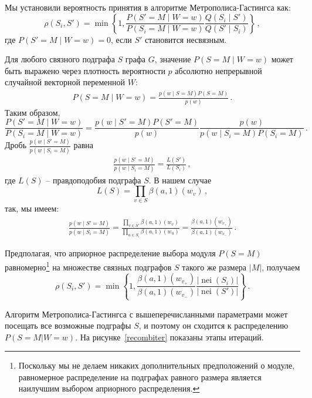 Мы установили вероятность принятия в алгоритме Метрополиса-Гастингса как:
\[\rho(S_i,S') = \min \left\{1,\frac{P(S'=M \mid W = w)}{P(S_i=M \mid
W = w)}\frac{Q(S_i \mid S')}{Q(S' \mid S_i)} \right\} \, ,\]
где $P(S'=M \mid W = w) = 0$, если $S'$ становится несвязным. 

Для любого связного подграфа $S$ графа $G$, значение $P(S=M \mid W=w)$ может
быть выражено через плотность вероятности $p$ абсолютно непрерывной случайной
векторной переменной $W$:
\begin{align}
    P(S=M \mid W = w) = \frac{p(w \mid S=M)P(S=M)}{p(w)} \, .
    \label{eq:graphprobs}
\end{align}
Таким образом,
\[\frac{P(S'=M \mid W = w)}{P(S_i=M \mid W = w)} = \frac{p(w \mid
S'=M)P(S'=M)}{p(w)}\frac{p(w)}{p(w \mid S_i=M)P(S_i=M)} \, .\]
Дробь $\frac{p(w \mid S'=M)}{p(w \mid S_i=M)}$ равна
\begin{align}
    \frac{p(w \mid S'=M)}{p(w \mid S_i=M)} = \frac{L(S')}{L(S_i)} \, ,
    \label{eq:likelihood}
\end{align}
где $L(S)$ -- правдоподобия подграфа $S$. В нашем случае
\[L(S) = \prod_{v\in S}\beta(a,1)(w_v) \, ,\]
так, мы имеем:
\begin{align}
    \frac{p(w \mid S'=M)}{p(w \mid S_i=M)} = \frac{\prod_{v\in S'}\beta(a,1)(w_v)}{\prod_{u\in S_i}\beta(a,1)(w_u)} = \frac{\beta(a,1)(w_{v_+})}{\beta(a,1)(w_{v_-})} \, .
    \label{eq:accept_probs}
\end{align}

Предполагая, что априорное распределение выбора модуля $P(S=M)$
равномерно\footnote{Поскольку мы не делаем никаких дополнительных предположений
о модуле, равномерное распределение на подграфах равного размера является
наилучшим выбором априорного распределения.} на множестве связных подграфов $S$
такого же размера $|M|$, получаем
\[ \rho(S_i,S') = \min \left\{1,
\frac{\beta(a,1)(w_{v_+})}{\beta(a,1)(w_{v_-})}
\frac{|\operatorname{nei}(S_{i})|}{|\operatorname{nei}(S')|} \right\} \, .\]

Алгоритм Метрополиса-Гастингса с вышеперечисланными параметрами может посещать
все возможные подграфы $S$, и поэтому он сходится к распределению $P(S=M|W=w)$.
На рисунке~\ref{recombiter} показаны этапы итераций.

